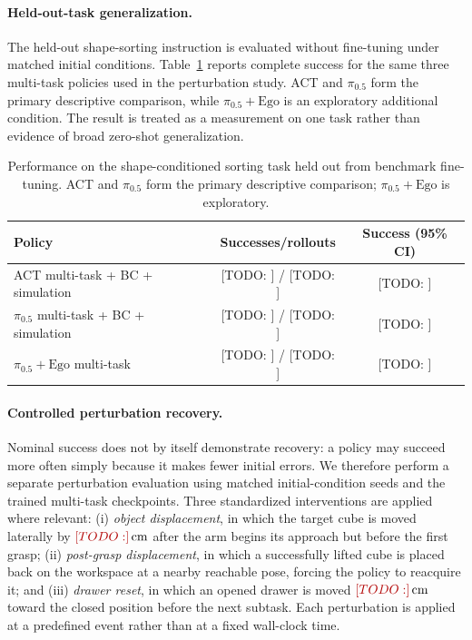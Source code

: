 \documentclass[10pt,conference]{IEEEtran}
\newcommand{\TODO}[1]{\textcolor{red!70!black}{[TODO: #1]}}
\begin{document}
\paragraph{Held-out-task generalization.}
The held-out shape-sorting instruction is evaluated without fine-tuning under
matched initial conditions. Table~\ref{tab:held-out-task} reports complete
success for the same three multi-task policies used in the perturbation study.
ACT and $\pi_{0.5}$ form the primary descriptive comparison, while
$\pi_{0.5}+\mathrm{Ego}$ is an exploratory additional condition. The result is
treated as a measurement on one task rather than evidence of broad zero-shot
generalization.

\begin{table}[t]
\centering
\small
\caption{Performance on the shape-conditioned sorting task held out from
benchmark fine-tuning. ACT and $\pi_{0.5}$ form the primary descriptive
comparison; $\pi_{0.5}+\mathrm{Ego}$ is exploratory.}
\label{tab:held-out-task}
\begin{tabular}{@{}lcc@{}}
\toprule
Policy & Successes/rollouts & Success (95\% CI) \\
\midrule
ACT multi-task + BC + simulation & \TODO{} / \TODO{} & \TODO{} \\
$\pi_{0.5}$ multi-task + BC + simulation & \TODO{} / \TODO{} & \TODO{} \\
$\pi_{0.5}+\mathrm{Ego}$ multi-task & \TODO{} / \TODO{} & \TODO{} \\
\bottomrule
\end{tabular}
\end{table}

\paragraph{Controlled perturbation recovery.}
Nominal success does not by itself demonstrate recovery: a policy may succeed
more often simply because it makes fewer initial errors. We therefore perform a
separate perturbation evaluation using matched initial-condition seeds and the
trained multi-task checkpoints. Three standardized interventions are applied
where relevant: (i) \emph{object displacement}, in which the target cube is
moved laterally by $\TODO{}\,\mathrm{cm}$ after the arm begins its approach but
before the first grasp; (ii) \emph{post-grasp displacement}, in which a
successfully lifted cube is placed back on the workspace at a nearby reachable
pose, forcing the policy to reacquire it; and (iii) \emph{drawer reset}, in
which an opened drawer is moved $\TODO{}\,\mathrm{cm}$ toward the closed
position before the next subtask. Each perturbation is applied at a predefined
event rather than at a fixed wall-clock time.
\end{document}
